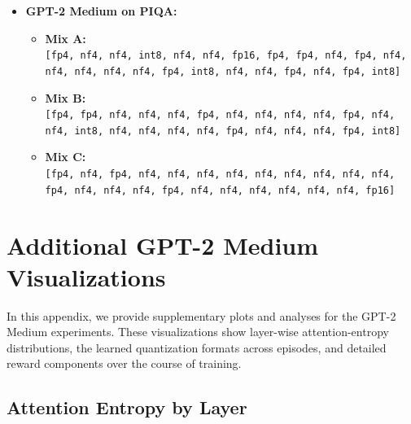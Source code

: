 \documentclass{article}
\begin{document}
{\begin{itemize}
\begin{itemize}
				\item \textbf{Mix B:}\\
				\texttt{[fp4, fp4, nf4, nf4, nf4, fp4, nf4, nf4, nf4, nf4, fp4, nf4, nf4, int8, nf4, nf4, nf4, nf4, fp4, nf4, nf4, nf4, fp4, int8]}
				
				\item \textbf{Mix C:}\\
				\texttt{[fp4, nf4, fp4, nf4, nf4, nf4, nf4, nf4, nf4, nf4, nf4, nf4, fp4, nf4, nf4, nf4, fp4, nf4, nf4, nf4, nf4, nf4, nf4, fp16]}
			\end{itemize}
			\item \textbf{GPT-2 Medium on PIQA:}
			\begin{itemize}
				\item \textbf{Mix A:}\\
				\texttt{[fp4, nf4, nf4, int8, nf4, nf4, fp16, fp4, fp4, nf4, fp4, nf4, nf4, nf4, nf4, nf4, fp4, int8, nf4, nf4, fp4, nf4, fp4, int8]}
				
				\item \textbf{Mix B:}\\
				\texttt{[fp4, fp4, nf4, nf4, nf4, fp4, nf4, nf4, nf4, nf4, fp4, nf4, nf4, int8, nf4, nf4, nf4, nf4, fp4, nf4, nf4, nf4, fp4, int8]}
				
				\item \textbf{Mix C:}\\
				\texttt{[fp4, nf4, fp4, nf4, nf4, nf4, nf4, nf4, nf4, nf4, nf4, nf4, fp4, nf4, nf4, nf4, fp4, nf4, nf4, nf4, nf4, nf4, nf4, fp16]}
			\end{itemize}
		\end{itemize}
	} %
	
	\section{Additional GPT-2 Medium Visualizations}
	\label{sec:appendix-b}
	
	In this appendix, we provide supplementary plots and analyses for the GPT-2 Medium experiments. These visualizations show layer-wise attention-entropy distributions, the learned quantization formats across episodes, and detailed reward components over the course of training.
	
	\vspace{0.5em}
	\subsection{Attention Entropy by Layer}
	\label{sec:medium-attn-entropy}
	
\end{document}
